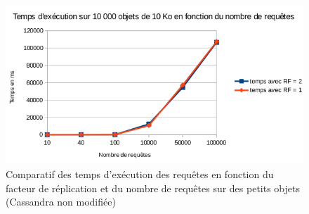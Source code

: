 \documentclass[12pt]{article}
\begin{document}
\begin{figure}[p]
	\centering
		\includegraphics[width=15cm]{images/tests/cassandra_non_modif-RF-PO.png}
	\caption{Comparatif des temps d'exécution des requêtes en fonction du facteur de réplication et du nombre de requêtes sur des petits objets (Cassandra non modifiée) \label{fig:test_cassandra_non_modif_RF_PO}}
\end{figure}
\end{document}
